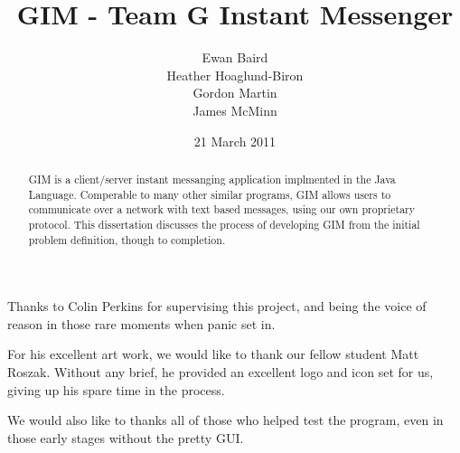 \documentclass{l3proj}
\begin{document}
\title{GIM - Team G Instant Messenger}
\author{Ewan Baird \\
Heather Hoaglund-Biron \\
Gordon Martin \\
James McMinn}
\date{21 March 2011}
\maketitle
\begin{abstract}

GIM is a client/server instant messanging application implmented in the Java Language. Comperable to many other similar programs, GIM allows users to communicate over a network with text based messages, using our own proprietary protocol. This dissertation discusses the process of developing GIM from the initial problem definition, though to completion.

\end{abstract}

\begin{acknowledgments}

Thanks to Colin Perkins for supervising this project, and being the voice of reason in those rare moments when panic set in.

For his excellent art work, we would like to thank our fellow student Matt Roszak. Without any brief, he provided an excellent logo and icon set for us, giving up his spare time in the process.

We would also like to thanks all of those who helped test the program, even in those early stages without the pretty GUI.

\end{acknowledgments}

\educationalconsent
\tableofcontents

















\end{document}

